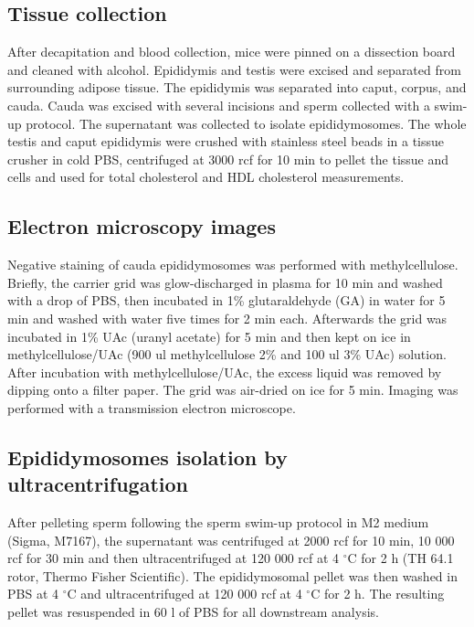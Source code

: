 \documentclass[12pt,twoside]{reedthesis}
\begin{document}
\hypertarget{tissue-collection}{%
\subsection{Tissue collection}\label{tissue-collection}}

After decapitation and blood collection, mice were pinned on a dissection board and cleaned with alcohol. Epididymis and testis were excised and separated from surrounding adipose tissue. The epididymis was separated into caput, corpus, and cauda. Cauda was excised with several incisions and sperm collected with a swim-up protocol. The supernatant was collected to isolate epididymosomes. The whole testis and caput epididymis were crushed with stainless steel beads in a tissue crusher in cold PBS, centrifuged at 3000 rcf for 10 min to pellet the tissue and cells and used for total cholesterol and HDL cholesterol measurements.

\hypertarget{electron-microscopy-images}{%
\subsection{Electron microscopy images}\label{electron-microscopy-images}}

Negative staining of cauda epididymosomes was performed with methylcellulose. Briefly, the carrier grid was glow-discharged in plasma for 10 min and washed with a drop of PBS, then incubated in 1\% glutaraldehyde (GA) in water for 5 min and washed with water five times for 2 min each. Afterwards the grid was incubated in 1\% UAc (uranyl acetate) for 5 min and then kept on ice in methylcellulose/UAc (900 ul methylcellulose 2\% and 100 ul 3\% UAc) solution. After incubation with methylcellulose/UAc, the excess liquid was removed by dipping onto a filter paper. The grid was air-dried on ice for 5 min. Imaging was performed with a transmission electron microscope.

\hypertarget{epididymosomes-isolation-by-ultracentrifugation}{%
\subsection{Epididymosomes isolation by ultracentrifugation}\label{epididymosomes-isolation-by-ultracentrifugation}}

After pelleting sperm following the sperm swim-up protocol in M2 medium (Sigma, M7167), the supernatant was centrifuged at 2000 rcf for 10 min, 10 000 rcf for 30 min and then ultracentrifuged at 120 000 rcf at 4 \(^{\circ}\)C for 2 h (TH 64.1 rotor, Thermo Fisher Scientific). The epididymosomal pellet was then washed in PBS at 4 \(^{\circ}\)C and ultracentrifuged at 120 000 rcf at 4 \(^{\circ}\)C for 2 h. The resulting pellet was resuspended in 60 \textmu l of PBS for all downstream analysis.
\end{document}
